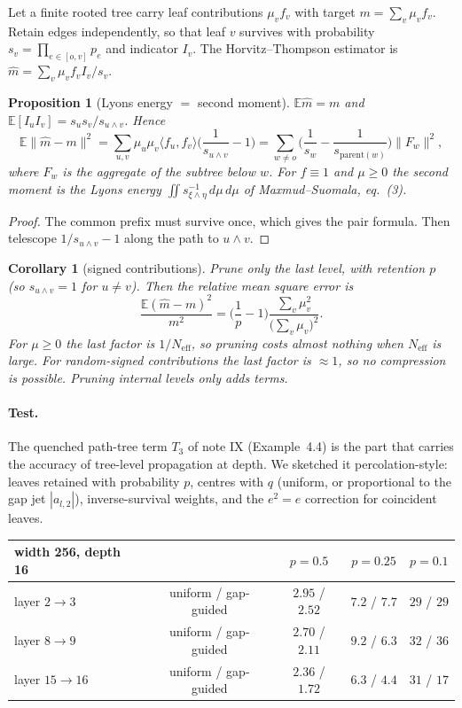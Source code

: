 \documentclass[11pt]{article}
\newtheorem{proposition}[theorem]{Proposition}
\newtheorem{corollary}[theorem]{Corollary}
\theoremstyle{definition}
\theoremstyle{remark}
\newcommand{\E}{\mathbb E}
\begin{document}
Let a finite rooted tree carry leaf contributions $\mu_vf_v$ with target $m=\sum_v\mu_vf_v$. Retain edges independently, so that leaf $v$ survives with probability $s_v=\prod_{e\in[o,v]}p_e$ and indicator $I_v$. The Horvitz--Thompson estimator is $\hat m=\sum_v\mu_vf_vI_v/s_v$.

\begin{proposition}[Lyons energy $=$ second moment]\label{prop:ht}
$\E\hat m=m$ and $\E[I_uI_v]=s_us_v/s_{u\wedge v}$. Hence
\[
\E\|\hat m-m\|^2=\sum_{u,v}\mu_u\mu_v\langle f_u,f_v\rangle\Big(\frac1{s_{u\wedge v}}-1\Big)=\sum_{w\ne o}\Big(\frac1{s_w}-\frac1{s_{\mathrm{parent}(w)}}\Big)\|F_w\|^2,
\]
where $F_w$ is the aggregate of the subtree below $w$. For $f\equiv1$ and $\mu\ge0$ the second moment is the Lyons energy $\iint s_{\xi\wedge\eta}^{-1}\,d\mu\,d\mu$ of Maxmud--Suomala, eq.~(3).
\end{proposition}

\begin{proof}
The common prefix must survive once, which gives the pair formula. Then telescope $1/s_{u\wedge v}-1$ along the path to $u\wedge v$.
\end{proof}

\begin{corollary}[signed contributions]\label{cor:signed}
Prune only the last level, with retention $p$ (so $s_{u\wedge v}=1$ for $u\ne v$). Then the relative mean square error is
\[
\frac{\E(\hat m-m)^2}{m^2}=\Big(\frac1p-1\Big)\frac{\sum_v\mu_v^2}{\big(\sum_v\mu_v\big)^2}.
\]
For $\mu\ge0$ the last factor is $1/N_{\mathrm{eff}}$, so pruning costs almost nothing when $N_{\mathrm{eff}}$ is large. For random-signed contributions the last factor is $\approx1$, so no compression is possible. Pruning internal levels only adds terms.
\end{corollary}

\paragraph{Test.} The quenched path-tree term $T_3$ of note IX (Example~4.4) is the part that carries the accuracy of tree-level propagation at depth. We sketched it percolation-style: leaves retained with probability $p$, centres with $q$ (uniform, or proportional to the gap jet $|a_{l,2}|$), inverse-survival weights, and the $e^2=e$ correction for coincident leaves.

\begin{center}\small
\begin{tabular}{@{}lcccc@{}}
\toprule
width 256, depth 16 & & $p=0.5$ & $p=0.25$ & $p=0.1$\\
\midrule
layer $2\to3$ & uniform / gap-guided & $2.95$ / $2.52$ & $7.2$ / $7.7$ & $29$ / $29$\\
layer $8\to9$ & uniform / gap-guided & $2.70$ / $2.11$ & $9.2$ / $6.3$ & $32$ / $36$\\
layer $15\to16$ & uniform / gap-guided & $2.36$ / $1.72$ & $6.3$ / $4.4$ & $31$ / $17$\\
\bottomrule
\end{tabular}
\end{center}
\end{document}
